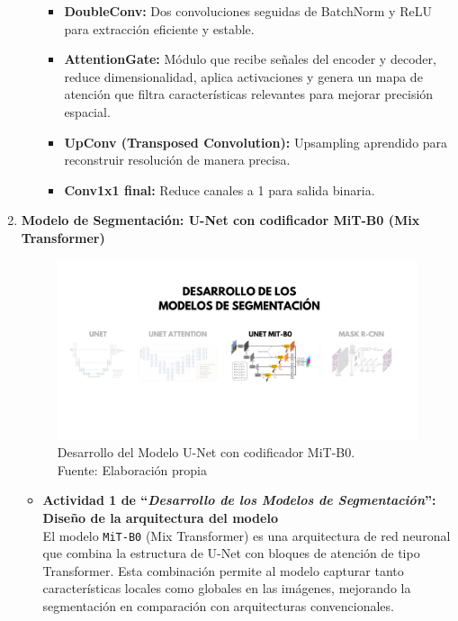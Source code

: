 \begin{enumerate}
\begin{itemize}
  \begin{itemize}
    \item \textbf{DoubleConv:} Dos convoluciones seguidas de BatchNorm y ReLU para extracción eficiente y estable.
    \item \textbf{AttentionGate:} Módulo que recibe señales del encoder y decoder, reduce dimensionalidad, aplica activaciones y genera un mapa de atención que filtra características relevantes para mejorar precisión espacial.
    \item \textbf{UpConv (Transposed Convolution):} Upsampling aprendido para reconstruir resolución de manera precisa.
    \item \textbf{Conv1x1 final:} Reduce canales a 1 para salida binaria.
  \end{itemize}
  \end{itemize}
  \newpage
  \item \textbf{Modelo de Segmentación: U-Net con codificador MiT-B0 (Mix Transformer)}
  \begin{figure}[H]
	\begin{center}
		\includegraphics[width=1\textwidth]{4/figures/desunetmit.png}
		\caption[Desarrollo del Modelo U-Net con codificador MiT-B0]{Desarrollo del Modelo U-Net con codificador MiT-B0.\\
		Fuente: Elaboración propia}
		\label{4:figdesunetmit}
	\end{center}
\end{figure}
  \begin{itemize}

  \item\textbf{Actividad 1 de “\textit{Desarrollo de los Modelos de Segmentación}”: Diseño de la arquitectura del modelo}
\\
  El modelo \texttt{MiT-B0} (Mix Transformer) es una arquitectura de red neuronal que combina la estructura de U-Net con bloques de atención de tipo Transformer. Esta combinación permite al modelo capturar tanto características locales como globales en las imágenes, mejorando la segmentación en comparación con arquitecturas convencionales.


\end{itemize}
\end{enumerate}
